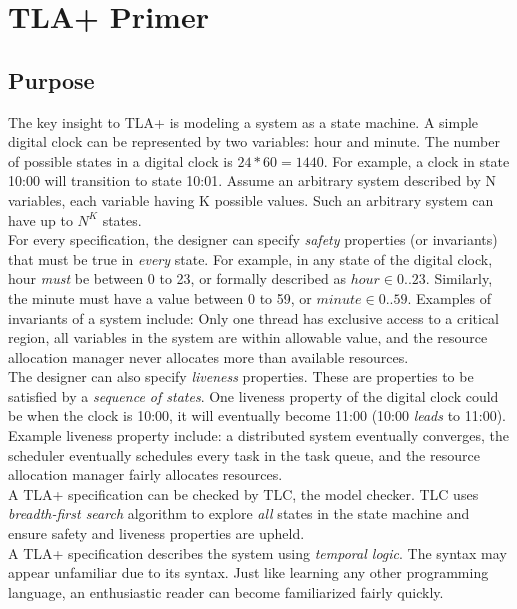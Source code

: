 \chapter{TLA+ Primer}

\section{Purpose}

The key insight to TLA+ is modeling a system as a state machine. A simple
digital clock can be represented by two variables: hour and minute. The
number of possible states in a digital clock is $24 * 60 = 1440$. For example, a
clock in state 10:00 will transition to state 10:01. Assume an arbitrary system
described by N variables, each variable having K possible values. Such an
arbitrary system can have up to $N^K$ states.\\

For every specification, the designer can specify \textit{safety} properties (or
invariants) that must be true in \textit{every} state. For example, in any
state of the digital clock, hour \textit{must} be between 0 to 23, or formally
described as $hour \in 0..23$. Similarly, the minute must have a value between 0 to
59, or $minute \in 0..59$. Examples of invariants of a system include: Only one
thread has exclusive access to a critical region, all variables in the system
are within allowable value, and the resource allocation manager never allocates more
than available resources.\\

The designer can also specify \textit{liveness} properties. These are properties to be
satisfied by a \textit{sequence of states}. One liveness property of the digital
clock could be when the clock is 10:00, it will eventually become 11:00 (10:00
\textit{leads} to 11:00). Example liveness property include: a distributed
system eventually converges, the scheduler eventually schedules every task in
the task queue, and the resource allocation manager fairly allocates resources.
\\

A TLA+ specification can be checked by TLC, the model checker. TLC uses
\textit{breadth-first search} algorithm to explore \textit{all} states in the
state machine and ensure safety and liveness properties are upheld.\\

A TLA+ specification describes the system using \textit{temporal logic}. The
syntax may appear unfamiliar due to its syntax. Just like learning any other
programming language, an enthusiastic reader can become familiarized fairly
quickly.


